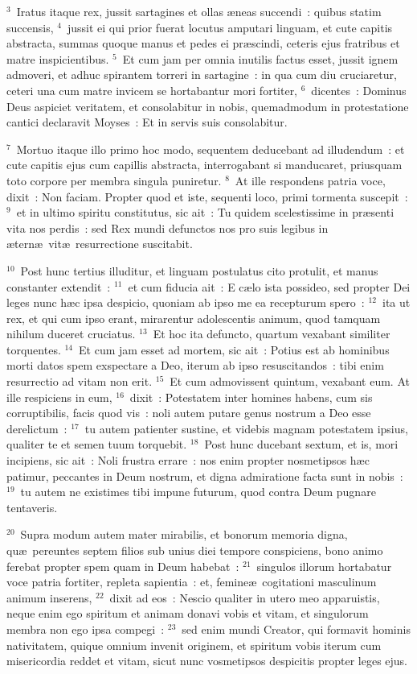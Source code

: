 ${}^{3}$~Iratus itaque rex, jussit sartagines et ollas \ae neas succendi~: quibus statim succensis,
${}^{4}$~jussit ei qui prior fuerat locutus amputari linguam, et cute capitis abstracta, summas quoque manus et pedes ei pr\ae scindi, ceteris ejus fratribus et matre inspicientibus.
${}^{5}$~Et cum jam per omnia inutilis factus esset, jussit ignem admoveri, et adhuc spirantem torreri in sartagine~: in qua cum diu cruciaretur, ceteri una cum matre invicem se hortabantur mori fortiter,
${}^{6}$~dicentes~: Dominus Deus aspiciet veritatem, et consolabitur in nobis, quemadmodum in protestatione cantici declaravit Moyses~: Et in servis suis consolabitur.


${}^{7}$~Mortuo itaque illo primo hoc modo, sequentem deducebant ad illudendum~: et cute capitis ejus cum capillis abstracta, interrogabant si manducaret, priusquam toto corpore per membra singula puniretur.
${}^{8}$~At ille respondens patria voce, dixit~: Non faciam. Propter quod et iste, sequenti loco, primi tormenta suscepit~:
${}^{9}$~et in ultimo spiritu constitutus, sic ait~: Tu quidem scelestissime in pr\ae senti vita nos perdis~: sed Rex mundi defunctos nos pro suis legibus in \ae tern\ae\ vit\ae\ resurrectione suscitabit.


${}^{10}$~Post hunc tertius illuditur, et linguam postulatus cito protulit, et manus constanter extendit~:
${}^{11}$~et cum fiducia ait~: E c\ae lo ista possideo, sed propter Dei leges nunc h\ae c ipsa despicio, quoniam ab ipso me ea recepturum spero~:
${}^{12}$~ita ut rex, et qui cum ipso erant, mirarentur adolescentis animum, quod tamquam nihilum duceret cruciatus.
${}^{13}$~Et hoc ita defuncto, quartum vexabant similiter torquentes.
${}^{14}$~Et cum jam esset ad mortem, sic ait~: Potius est ab hominibus morti datos spem exspectare a Deo, iterum ab ipso resuscitandos~: tibi enim resurrectio ad vitam non erit.
${}^{15}$~Et cum admovissent quintum, vexabant eum. At ille respiciens in eum,
${}^{16}$~dixit~: Potestatem inter homines habens, cum sis corruptibilis, facis quod vis~: noli autem putare genus nostrum a Deo esse derelictum~:
${}^{17}$~tu autem patienter sustine, et videbis magnam potestatem ipsius, qualiter te et semen tuum torquebit.
${}^{18}$~Post hunc ducebant sextum, et is, mori incipiens, sic ait~: Noli frustra errare~: nos enim propter nosmetipsos h\ae c patimur, peccantes in Deum nostrum, et digna admiratione facta sunt in nobis~:
${}^{19}$~tu autem ne existimes tibi impune futurum, quod contra Deum pugnare tentaveris.


${}^{20}$~Supra modum autem mater mirabilis, et bonorum memoria digna, qu\ae\ pereuntes septem filios sub unius diei tempore conspiciens, bono animo ferebat propter spem quam in Deum habebat~:
${}^{21}$~singulos illorum hortabatur voce patria fortiter, repleta sapientia~: et, femine\ae\ cogitationi masculinum animum inserens,
${}^{22}$~dixit ad eos~: Nescio qualiter in utero meo apparuistis, neque enim ego spiritum et animam donavi vobis et vitam, et singulorum membra non ego ipsa compegi~:
${}^{23}$~sed enim mundi Creator, qui formavit hominis nativitatem, quique omnium invenit originem, et spiritum vobis iterum cum misericordia reddet et vitam, sicut nunc vosmetipsos despicitis propter leges ejus.


